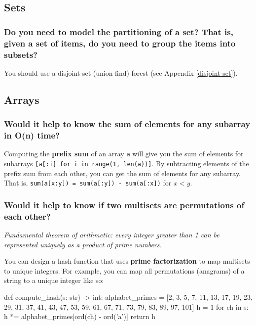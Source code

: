 \documentclass[12pt, titlepage]{article}
\begin{document}
\subsection{Sets}

\subsubsection{Do you need to model the partitioning of a set? That is, given a set of items, do you need to group the items into subsets?}

You should use a disjoint-set (union-find) forest (see Appendix \ref{disjoint-set}).

\subsection{Arrays}

\subsubsection{Would it help to know the sum of elements for any subarray in O(n) time?}

Computing the \textbf{prefix sum} of an array \texttt{a} will give you the sum of elements for subarrays \texttt{[a[:i] for i in range(1, len(a))]}. By subtracting elements of the prefix sum from each other, you can get the sum of elements for any subarray. That is, \texttt{sum(a[x:y]) = sum(a[:y]) - sum(a[:x])} for $x < y$. \\

\subsubsection{Would it help to know if two multisets are permutations of each other?}

\textit{Fundamental theorem of arithmetic: every integer greater than 1 can be represented uniquely as a product of prime numbers.} \medskip

You can design a hash function that uses \textbf{prime factorization} to map multisets to unique integers. For example, you can map all permutations (anagrams) of a string to a unique integer like so: \medskip

\begin{python}
def compute_hash(s: str) -> int:
    alphabet_primes = [2, 3, 5, 7, 11, 13, 17, 19, 23, 29,
                       31, 37, 41, 43, 47, 53, 59, 61, 67,
                       71, 73, 79, 83, 89, 97, 101]
    h = 1
    for ch in s:
        h *= alphabet_primes[ord(ch) - ord('a')]
    return h
\end{python} \bigskip
\end{document}
